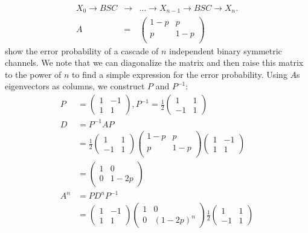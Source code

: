 \documentclass[10pt]{article}
\begin{document}
\begin{tiny}
\begin{multicols}{3}
\begin{eqnarray*}
    X_0 \rightarrow BSC &\rightarrow& \dots
    \rightarrow X_{n-1} \rightarrow BSC \rightarrow X_n. \\
 A &=&
 \begin{pmatrix}
  1-p & p   \\
  p   & 1-p \\
 \end{pmatrix}
\end{eqnarray*}
show the error probability of a cascade of $n$ independent binary symmetric channels. We note that we can diagonalize the matrix and then raise this matrix to the power of $n$ to find a simple expression for the error probability. Using $A$s eigenvectors as columns, we construct $P$ and $P^{-1}$:
\begin{align*}
P &= \begin{pmatrix} 1 & -1 \\ 1 & 1 \end{pmatrix}, P^{-1} = \frac{1}{2}\begin{pmatrix} 1 & 1 \\ -1 & 1 \end{pmatrix} \\
D &= P^{-1}AP \\
    &= \frac{1}{2}\begin{pmatrix} 1 & 1 \\ -1 & 1 \end{pmatrix}  \begin{pmatrix}
        1-p & p   \\
        p   & 1-p \\
    \end{pmatrix}\begin{pmatrix} 1 & -1 \\ 1 & 1 \end{pmatrix} \\
    &= \begin{pmatrix} 1 & 0 \\ 0 & 1 - 2p \end{pmatrix}  \\
A^n &= PD^nP^{-1} \\
    &= \begin{pmatrix} 1 & -1 \\ 1 & 1 \end{pmatrix} \begin{pmatrix} 1 & 0 \\ 0 & (1 - 2p)^n \end{pmatrix} \frac{1}{2}\begin{pmatrix} 1 & 1 \\ -1 & 1 \end{pmatrix} \\

\end{align*}
\end{multicols}
\end{tiny}
\end{document}
